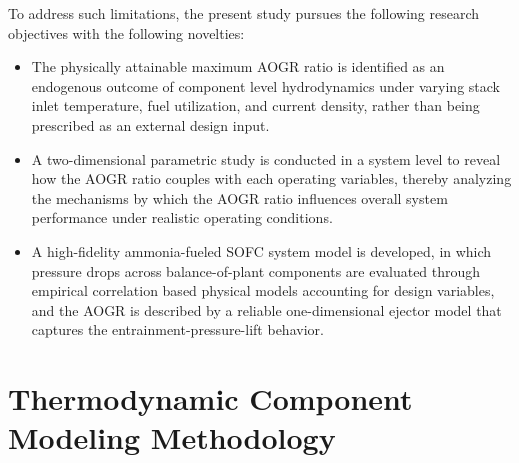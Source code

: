 \documentclass[a4paper,10pt]{cas-dc} %
\begin{document}
To address such limitations, the present study pursues the following research objectives with the following novelties:

\begin{itemize}
\item The physically attainable maximum AOGR ratio is identified as an endogenous outcome of component level hydrodynamics under varying stack inlet temperature, fuel utilization, and current density, rather than being prescribed as an external design input.
\item A two-dimensional parametric study is conducted in a system level to reveal how the AOGR ratio couples with each operating variables, thereby analyzing the mechanisms by which the AOGR ratio influences overall system performance under realistic operating conditions.
\item A high-fidelity ammonia-fueled SOFC system model is developed, in which pressure drops across balance-of-plant components are evaluated through empirical correlation based physical models accounting for design variables, and the AOGR is described by a reliable one-dimensional ejector model that captures the entrainment-pressure-lift behavior.
\end{itemize}

\section{Thermodynamic Component Modeling Methodology}
\end{document}
